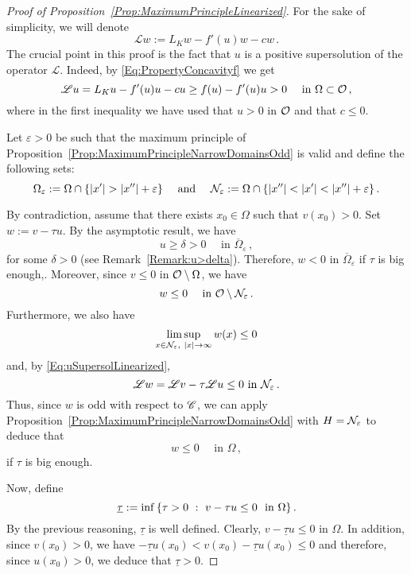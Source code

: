 \begin{proof}[Proof of Proposition~\ref{Prop:MaximumPrincipleLinearized}]
    


	For the sake of simplicity, we will denote 
	$$
	\mathscr{L} w := L_K w - f'(u)w - cw\,.
	$$
	The crucial point in this proof is the fact that $u$ is a positive supersolution of the operator $\mathscr{L}$. Indeed, by \eqref{Eq:PropertyConcavityf} we get
	\begin{equation}
	\label{Eq:uSupersolLinearized}
	\mathscr{L} u = L_K u - f'(u)u - cu \geq f(u) - f'(u)u > 0 \quad \textrm{ in } \Omega \subset \mathcal{O}\,,
	\end{equation}
	where in the first inequality we have used that $u>0$ in $\mathcal{O}$ and that $c\leq 0$.
	
	Let $\varepsilon > 0$ be such that the maximum principle of Proposition~\ref{Prop:MaximumPrincipleNarrowDomainsOdd} is valid and define the following sets:
	$$
	\Omega_\varepsilon := \Omega \cap \{|x'| > |x''| + \varepsilon\}\quad \textrm{ and } \quad 
	\mathcal{N}_\varepsilon := \Omega \cap \{|x''| < |x'| < |x''| + \varepsilon\}\,.
	$$
	
	
    
    By contradiction, assume that there exists $x_0\in \Omega$ such that $v(x_0)> 0$.
	Set $w := v - \tau u$. By the asymptotic result, we have 
	\begin{equation}
		\label{Eq:u>delta}
		u \geq \delta > 0 \quad \textrm{ in } \overline{\Omega}_\varepsilon\,,
	\end{equation}
	for some $\delta >0$ (see Remark~\ref{Remark:u>delta}). Therefore,  $w < 0$ in $\overline{\Omega}_\varepsilon$ if $\tau$ is big enough,. Moreover, since $v\leq 0$ in $\mathcal{O}\setminus\Omega$, we have 
	$$
	w \leq 0 \quad \textrm{ in } \mathcal{O} \setminus \mathcal{N}_\varepsilon\,.
	$$
	Furthermore, we also have
	$$
	\limsup_{x\in \mathcal{N}_\varepsilon, \ |x|\to \infty} w(x) \leq 0
	$$
	and, by \eqref{Eq:uSupersolLinearized},
	$$
	\mathscr{L} w = \mathscr{L} v - \tau \mathscr{L} u \leq 0 \textrm{ in } \mathcal{N}_\varepsilon\,.
	$$
	Thus, since $w$ is odd with respect to $\mathscr{C}$, we can apply Proposition~\ref{Prop:MaximumPrincipleNarrowDomainsOdd} with $H = \mathcal{N}_\varepsilon$ to deduce that
	$$
	w \leq 0 \quad \textrm{ in } \Omega\,,
	$$
	if $\tau$ is big enough.
	
	Now, define 
	$$
	\underline{\tau}:= \inf \left \{ \tau > 0 \ : \ v - \tau u \leq 0 \ \textrm{ in } \Omega \right \}.
	$$
	By the previous reasoning, $\underline{\tau}$ is well defined. Clearly, $v - \underline{\tau} u \leq 0 $ in $\Omega$. In addition, since $v(x_0)>0$, we have $-\underline{\tau} u(x_0) < v(x_0) - \underline{\tau} u (x_0) \leq 0$ and therefore, since $u(x_0)>0$, we deduce that  $\underline{\tau} > 0$.
	

\end{proof}
